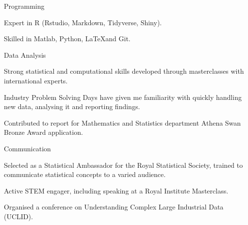 \begin{cventries}
    \cventry
    {}
    {Programming}
    {}
    {}
    {
       \begin{cvitems}
        \item {Expert in R (Rstudio, Markdown, Tidyverse, Shiny).}
        \item {Skilled in Matlab, Python, \LaTeX and Git.}
        \end{cvitems}
    }
  \cventry
    {}
    {Data Analysis}
    {}
    {}
    {
      \begin{cvitems}
        \item {Strong statistical and computational skills developed through masterclasses with international experts.}
        \item {Industry Problem Solving Days have given me familiarity with quickly handling new data, analysing it and reporting findings.}
        \item {Contributed to report for Mathematics and Statistics department Athena Swan Bronze Award application.}
      \end{cvitems}
    }
    \cventry
    {}
    {Communication}
    {}
    {}
    {
      \begin{cvitems}
        \item {Selected as a Statistical Ambassador for the Royal Statistical Society, trained to communicate statistical concepts to a varied audience.}
        \item {Active STEM engager, including speaking at a Royal Institute Masterclass.}
        \item{ Organised a conference on Understanding Complex Large Industrial Data (UCLID).}
      \end{cvitems}
    }
    \end{cventries}
